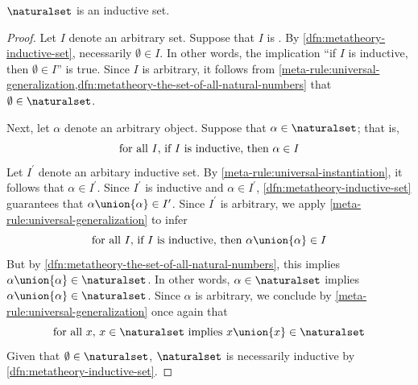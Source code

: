 \begin{thm}
     \label{thm:metatheory-the-set-of-all-natural-numbers-is-inductive}
    \( \naturalset \) is an inductive set.
\end{thm}

\begin{proof}
    Let \( I \) denote an arbitrary set.
    Suppose that \( I \) is .
    By \cref{dfn:metatheory-inductive-set}, necessarily \( \emptyset \in I \).
    In other words, the implication ``if \( I \) is inductive, then \( \emptyset \in I \)'' is true.
    Since \( I \) is arbitrary, it follows from \cref{meta-rule:universal-generalization,dfn:metatheory-the-set-of-all-natural-numbers}
    that \( \emptyset \in \naturalset \).

    \vspace{0.3cm}
    \noindent
    Next, let \( \alpha \) denote an arbitrary object. Suppose that \( \alpha \in \naturalset \); that is,
    \begin{equation*}
        \text{for all \( I \), if \( I \) is inductive, then \( \alpha \in I \)}
    \end{equation*}
    Let \( I^{\prime} \) denote an arbitary inductive set. By \cref{meta-rule:universal-instantiation}, it follows that
    \( \alpha \in I^{\prime} \). Since \( I^{\prime} \) is inductive and \( \alpha \in I^{\prime} \),
    \cref{dfn:metatheory-inductive-set} guarantees that \( \alpha \union \mleft\{ \alpha \mright\} \in I^{\prime} \).
    Since \( I^{\prime} \) is arbitrary, we apply \cref{meta-rule:universal-generalization} to infer
    \begin{equation*}
        \text{for all \( I \), if \( I \) is inductive, then \( \alpha \union \mleft\{ \alpha \mright\} \in I \)}
    \end{equation*}
    But by \cref{dfn:metatheory-the-set-of-all-natural-numbers}, this implies \( \alpha \union \mleft\{ \alpha \mright\} \in \naturalset \).
    In other words, \( \alpha \in \naturalset \) implies \( \alpha \union \mleft\{ \alpha \mright\} \in \naturalset \).
    Since \( \alpha \) is arbitrary, we conclude by \cref{meta-rule:universal-generalization} once again that
    \begin{equation*}
        \text{for all \( x \), \( x \in \naturalset \) implies \( x \union \mleft\{ x \mright\} \in \naturalset \)}
    \end{equation*}
    Given that \( \emptyset \in \naturalset \), \( \naturalset \) is necessarily inductive by \cref{dfn:metatheory-inductive-set}.
\end{proof}

